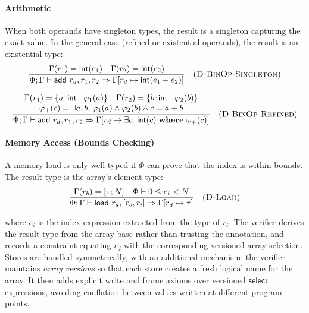 \paragraph{Arithmetic}
When both operands have singleton types, the result is a singleton capturing the exact value. In the general case (refined or existential operands), the result is an existential type:
$$
\frac{\Gamma(r_1) = \textsf{int}(e_1) \quad \Gamma(r_2) = \textsf{int}(e_2)}{\Phi; \Gamma \vdash \textsf{add } r_d, r_1, r_2 \Rightarrow \Gamma[r_d \mapsto \textsf{int}(e_1 + e_2)]} \quad (\textsc{D-BinOp-Singleton})
$$

$$
\frac{
  \begin{array}{c}
    \Gamma(r_1) = \{a\!:\!\textsf{int} \mid \varphi_1(a)\} \quad \Gamma(r_2) = \{b\!:\!\textsf{int} \mid \varphi_2(b)\} \\
    \varphi_+(c) = \exists a,b.\; \varphi_1(a) \wedge \varphi_2(b) \wedge c = a + b
  \end{array}
}{\Phi; \Gamma \vdash \textsf{add } r_d, r_1, r_2 \Rightarrow \Gamma[r_d \mapsto \exists c.\; \textsf{int}(c) \;\mathbf{where}\; \varphi_+(c)]} \quad (\textsc{D-BinOp-Refined})
$$

\paragraph{Memory Access (Bounds Checking)}
A memory load is only well-typed if $\Phi$ can prove that the index is within bounds. The result type is the array's element type:
$$
\frac{\Gamma(r_b) = [\tau; N] \quad \Phi \vdash 0 \le e_i < N}{\Phi; \Gamma \vdash \textsf{load } r_d, [r_b, r_i] \Rightarrow \Gamma[r_d \mapsto \tau]} \quad (\textsc{D-Load})
$$

\noindent where $e_i$ is the index expression extracted from the type of $r_i$. The verifier derives the result type from the array base rather than trusting the annotation, and records a constraint equating $r_d$ with the corresponding versioned array selection. Stores are handled symmetrically, with an additional mechanism: the verifier maintains \textit{array versions} so that each store creates a fresh logical name for the array. It then adds explicit write and frame axioms over versioned $\textsf{select}$ expressions, avoiding conflation between values written at different program points. 

